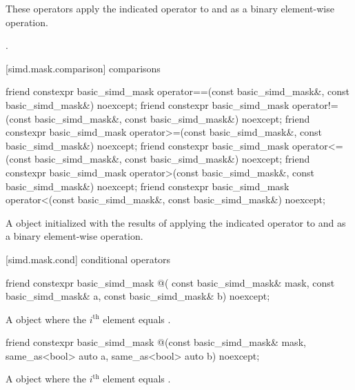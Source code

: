 \begin{itemdescr}
  \pnum\effects
  These operators apply the indicated operator to  and  as a binary element-wise operation.

  \pnum\returns
  .
\end{itemdescr}

[simd.mask.comparison]{ comparisons}

\begin{itemdecl}
friend constexpr basic_simd_mask
  operator==(const basic_simd_mask&, const basic_simd_mask&) noexcept;
friend constexpr basic_simd_mask
  operator!=(const basic_simd_mask&, const basic_simd_mask&) noexcept;
friend constexpr basic_simd_mask
  operator>=(const basic_simd_mask&, const basic_simd_mask&) noexcept;
friend constexpr basic_simd_mask
  operator<=(const basic_simd_mask&, const basic_simd_mask&) noexcept;
friend constexpr basic_simd_mask
  operator>(const basic_simd_mask&, const basic_simd_mask&) noexcept;
friend constexpr basic_simd_mask
  operator<(const basic_simd_mask&, const basic_simd_mask&) noexcept;
\end{itemdecl}

\begin{itemdescr}
  \pnum\returns
  A  object initialized with the results of applying the indicated operator to  and  as a binary element-wise operation.
\end{itemdescr}

[simd.mask.cond]{ conditional operators}

\begin{itemdecl}
friend constexpr basic_simd_mask @\simdselect@(
  const basic_simd_mask& mask, const basic_simd_mask& a, const basic_simd_mask& b) noexcept;
\end{itemdecl}

\begin{itemdescr}
  \pnum\returns
  A  object where the $i^\text{th}$ element equals  \foralli.
\end{itemdescr}

\begin{itemdecl}
friend constexpr basic_simd_mask
@\simdselect@(const basic_simd_mask& mask, same_as<bool> auto a, same_as<bool> auto b) noexcept;
\end{itemdecl}

\begin{itemdescr}
  \pnum\returns
  A  object where the $i^\text{th}$ element equals  \foralli.
\end{itemdescr}

